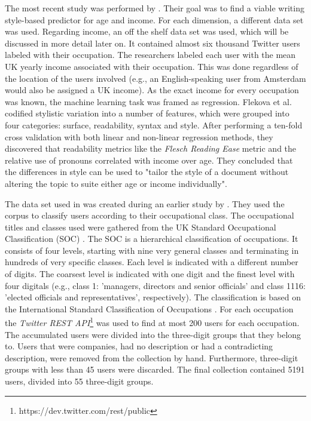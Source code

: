 \documentclass[
10pt, %
a4paper, %
oneside, %
headinclude,footinclude, %
] {book}%
\begin{document}
The most recent study was performed by \citet{flekova}. Their goal was to find a viable writing style-based predictor for age and income. For each dimension, a different data set was used. 
Regarding income, an off the shelf data set was used, which will be discussed in more detail later on. It contained almost six thousand Twitter users labeled with their occupation. The researchers labeled each user with the mean UK yearly income associated with their occupation. This was done regardless of the location of the users involved (e.g., an English-speaking user from Amsterdam would also be assigned a UK income). 
As the exact income for every occupation was known, the machine learning task was framed as regression. Flekova et al. codified stylistic variation into a number of features, which were grouped into four categories: surface, readability, syntax and style. 
After performing a ten-fold cross validation with both linear and non-linear regression methods, they discovered that readability metrics like the \textit{Flesch Reading Ease} metric and the relative use of pronouns correlated with income over age. They concluded that the differences in style can be used to "tailor the style of a document without altering the topic to suite either age or income individually".

The data set used in \citet{flekova} was created during an earlier study by \citet{pietro}. They used the corpus to classify users according to their occupational class. 
The occupational titles and classes used were gathered from the UK Standard Occupational Classification (SOC) \citep{uksoc}. The SOC is a hierarchical classification of occupations. It consists of four levels, starting with nine very general classes and terminating in hundreds of very specific classes. Each level is indicated with a different number of digits. The coarsest level is indicated with one digit and the finest level with four digitals (e.g., class 1: 'managers, directors and senior officials' and class 1116: 'elected officials and representatives', respectively). The classification is based on the International Standard Classification of Occupations \citep{isco}.
For each occupation the \textit{Twitter REST API}\footnote{https://dev.twitter.com/rest/public} was used to find at most 200 users for each occupation. The accumulated users were divided into the three-digit groups that they belong to. Users that were companies, had no description or had a contradicting description, were removed from the collection by hand. Furthermore, three-digit groups with less than 45 users were discarded. The final collection contained 5191 users, divided into 55 three-digit groups.
\end{document}
